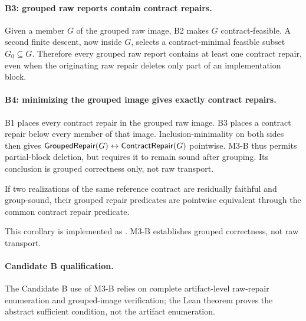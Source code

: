 \paragraph{B3: grouped raw reports contain contract repairs.}
Given a member \(G\) of the grouped raw image, B2 makes \(G\)
contract-feasible.  A second finite descent, now inside \(G\), selects a
contract-minimal feasible subset \(G_0\subseteq G\).  Therefore every grouped
raw report contains at least one contract repair, even when the originating
raw repair deletes only part of an implementation block.

\paragraph{B4: minimizing the grouped image gives exactly contract repairs.}
B1 places every contract repair in the grouped raw image.  B3 places a
contract repair below every member of that image.  Inclusion-minimality on
both sides then gives
\(\mathsf{GroupedRepair}(G)\leftrightarrow\mathsf{ContractRepair}(G)\) pointwise.  M3-B thus
permits partial-block deletion, but requires it to remain sound after
grouping.  Its conclusion is grouped correctness only, not raw transport.

\begin{corollary}
If two realizations of the same reference contract are residually faithful and
group-sound, their grouped repair predicates are pointwise equivalent through
the common contract repair predicate.
\end{corollary}

This corollary is implemented as .  M3-B establishes
grouped correctness, not raw transport.

\paragraph{Candidate B qualification.}
The Candidate B use of M3-B relies on complete artifact-level raw-repair
enumeration and grouped-image verification; the Lean theorem proves the
abstract sufficient condition, not the artifact enumeration.
